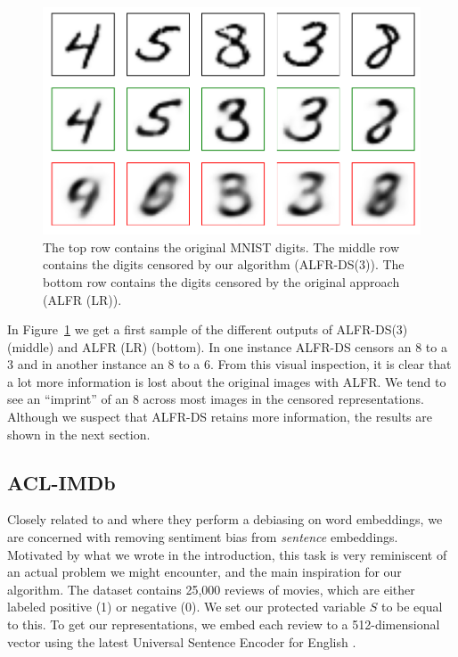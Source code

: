 \documentclass[nohyperref]{article}
\theoremstyle{plain}
\theoremstyle{definition}
\theoremstyle{remark}
\begin{document}
\begin{figure}[ht]
\vskip 0.2in
\begin{center}
\centerline{\includegraphics[width=\columnwidth]{mnist_digits}}
\caption{The top row contains the original MNIST digits. The middle row contains the digits censored by our algorithm (ALFR-DS(3)). The bottom row contains the digits censored by the original approach (ALFR (LR)).}
\label{mnist_digits}
\end{center}
\vskip -0.2in
\end{figure}
In Figure~\ref{mnist_digits} we get a first sample of the different outputs of ALFR-DS(3) (middle) and ALFR (LR) (bottom). In one instance ALFR-DS censors an 8 to a 3 and in another instance an 8 to a 6. From this visual inspection, it is clear that a lot more information is lost about the original images with ALFR. We tend to see an ``imprint'' of an 8 across most images in the censored representations. Although we suspect that ALFR-DS retains more information, the results are shown in the next section.
\subsection{ACL-IMDb}
Closely related to \cite{DBLP:conf/fat/SweeneyN20} and \cite{kenna2021using} where they perform a debiasing on word embeddings, we are concerned with removing sentiment bias from \emph{sentence} embeddings. Motivated by what we wrote in the introduction, this task is very reminiscent of an actual problem we might encounter, and the main inspiration for our algorithm. The dataset contains 25,000 reviews of movies, which are either labeled positive (1) or negative (0). We set our protected variable $S$ to be equal to this. To get our representations, we embed each review to a 512-dimensional vector using the latest Universal Sentence Encoder for English \cite{cer-etal-2018-universal}. 
\end{document}
